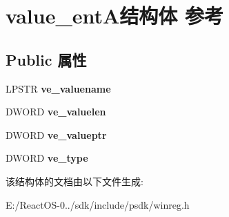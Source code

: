 \hypertarget{structvalue__ent_a}{}\section{value\+\_\+ent\+A结构体 参考}
\label{structvalue__ent_a}
\subsection*{Public 属性}
\begin{DoxyCompactItemize}
\item 
\mbox{\label{structvalue__ent_a_afac5db4a881bf252e08583d2da2f835d}} 
L\+P\+S\+TR {\bfseries ve\+\_\+valuename}
\item 
\mbox{\label{structvalue__ent_a_a33d1c4e2a111a4290a3a551168731490}} 
D\+W\+O\+RD {\bfseries ve\+\_\+valuelen}
\item 
\mbox{\label{structvalue__ent_a_a7d4bfea34576717cdafa6eac9b5bf5fb}} 
D\+W\+O\+RD {\bfseries ve\+\_\+valueptr}
\item 
\mbox{\label{structvalue__ent_a_a5cb53d8b3bd6fcb339af61221775ff85}} 
D\+W\+O\+RD {\bfseries ve\+\_\+type}
\end{DoxyCompactItemize}


该结构体的文档由以下文件生成\+:\begin{DoxyCompactItemize}
\item 
E\+:/\+React\+O\+S-\/0../sdk/include/psdk/winreg.\+h\end{DoxyCompactItemize}

